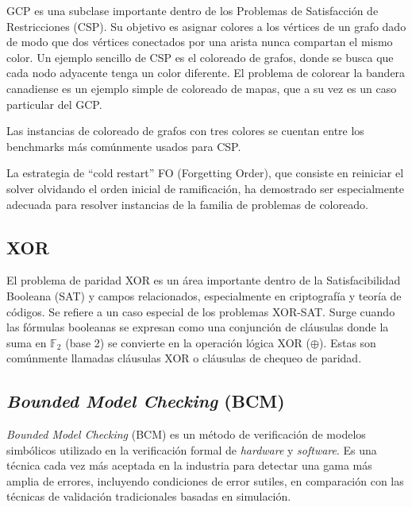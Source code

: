 GCP es una subclase importante dentro de los Problemas de Satisfacción de Restricciones (CSP). Su objetivo es asignar colores a los vértices de un grafo dado de modo que dos vértices conectados por una arista nunca compartan el mismo color. Un ejemplo sencillo de CSP es el coloreado de grafos, donde se busca que cada nodo adyacente tenga un color diferente. El problema de colorear la bandera canadiense es un ejemplo simple de coloreado de mapas, que a su vez es un caso particular del GCP. %

Las instancias de coloreado de grafos con tres colores se cuentan entre los benchmarks más comúnmente usados para CSP. %

La estrategia de “cold restart” FO (Forgetting Order), que consiste en reiniciar el solver olvidando el orden inicial de ramificación, ha demostrado ser especialmente adecuada para resolver instancias de la familia de problemas de coloreado. %

\subsection{XOR}
\label{subsec:xor}
El problema de paridad XOR es un área importante dentro de la Satisfacibilidad Booleana (SAT) y campos relacionados, especialmente en criptografía y teoría de códigos. Se refiere a un caso especial de los problemas XOR-SAT. %
Surge cuando las fórmulas booleanas se expresan como una conjunción de cláusulas donde la suma en $\mathbb{F}_2$ (base 2) se convierte en la operación lógica XOR ($\oplus$). %
Estas son comúnmente llamadas cláusulas XOR o cláusulas de chequeo de paridad. %

\subsection{\textit{Bounded Model Checking} (BCM)}
\label{subsec:bcm}
\textit{Bounded Model Checking} (BCM) es un método de verificación de modelos simbólicos utilizado en la verificación formal de \textit{hardware} y \textit{software}. Es una técnica cada vez más aceptada en la industria para detectar una gama más amplia de errores, incluyendo condiciones de error sutiles, en comparación con las técnicas de validación tradicionales basadas en simulación.

